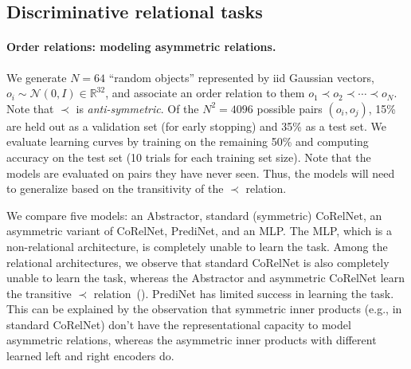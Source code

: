 \subsection{Discriminative relational tasks}\label{ssec:experiments_discriminative}


\paragraph{Order relations: modeling asymmetric relations.}

We generate $N = 64$ ``random objects'' represented by iid Gaussian vectors, $o_i \sim \mathcal{N}(0, I) \in \mathbb{R}^{32}$, and associate an order relation to them $o_1 \prec o_2 \prec \cdots \prec o_N$. Note that $\prec$ is \textit{anti-symmetric}. Of the $N^2 = 4096$ possible pairs $(o_i, o_j)$, 15\% are held out as a validation set (for early stopping) and 35\% as a test set. We evaluate learning curves by training on the remaining 50\% and computing accuracy on the test set (10 trials for each training set size). Note that the models are evaluated on pairs they have never seen. Thus, the models will need to generalize based on the transitivity of the $\prec$ relation.

We compare five models: an Abstractor, standard (symmetric) CoRelNet, an asymmetric variant of CoRelNet, PrediNet, and an MLP. The MLP, which is a non-relational architecture, is completely unable to learn the task. Among the relational architectures, we observe that standard CoRelNet is also completely unable to learn the task, whereas the Abstractor and asymmetric CoRelNet learn the transitive $\prec$ relation~(). PrediNet has limited success in learning the task. This can be explained by the observation that symmetric inner products (e.g., in standard CoRelNet) don't have the representational capacity to model asymmetric relations, whereas the asymmetric inner products with different learned left and right encoders do.

